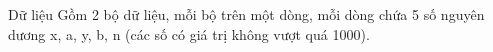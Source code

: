 Dữ liệu
Gồm 2 bộ dữ liệu, mỗi bộ trên một dòng, mỗi dòng chứa 5 số nguyên dương x, a, y, b, n (các số có giá trị không vượt quá 1000).